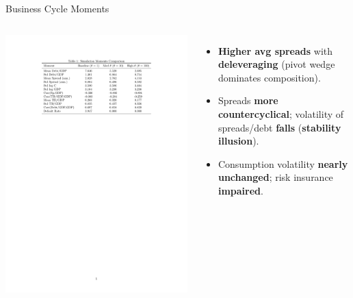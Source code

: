 \documentclass[aspectratio=169,11pt,professionalfonts]{beamer}
\newcommand{\1}{\mathbb{1}}
\begin{document}
\begin{frame}{Business Cycle Moments}
  \begin{columns}[T,onlytextwidth]
    \includegraphics[width=\linewidth]{../../pro-default-model/results/moments_comparison_table.pdf}
    \begin{itemize}
      \item \textbf{Higher avg spreads} with \textbf{deleveraging} (pivot wedge dominates composition).
      \item Spreads \textbf{more countercyclical}; volatility of spreads/debt
            \textbf{falls} (\textbf{stability illusion}).
      \item Consumption volatility \textbf{nearly unchanged}; risk insurance
            \textbf{impaired}.
    \end{itemize}
  \end{columns}
\end{frame}
\end{document}
